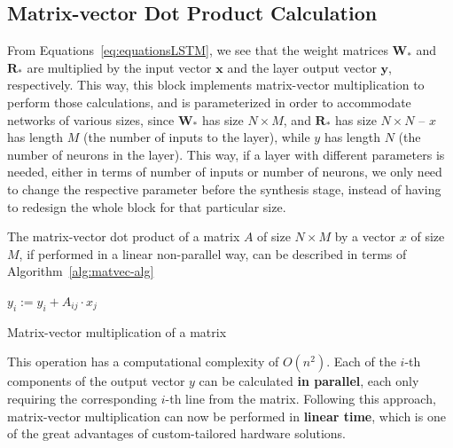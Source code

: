 \documentclass{IEEEtran}
\newcommand{\mb}[1]{\mathbf{#1}}
\begin{document}
\subsection{Matrix-vector Dot Product Calculation}\label{sec:proprarch_dot}
From Equations~\ref{eq:equationsLSTM}, we see that the weight matrices $\mb{W}_*$ and $\mb{R}_*$ are
multiplied by the input vector $\mb{x}$ and the layer output vector $\mb{y}$, respectively. This way,
this block implements matrix-vector multiplication to perform those calculations, and is parameterized in
order to accommodate networks of various sizes, since $\mb{W}_*$ has size $N\times M$, and $\mb{R}_*$
has size $N\times N$ -- $x$ has length $M$ (the number of inputs to the layer), while $y$ has length $N$
(the number of neurons in the layer). This way, if a layer with different parameters is needed, either in terms of
number of inputs or number of neurons, we only need to change the respective parameter before the synthesis stage,
instead of having to redesign the whole block for that particular size.

The matrix-vector dot product of a matrix $A$ of size $N \times M$ by a vector $x$ of size $M$, if performed in a linear non-parallel way, can be described in terms of Algorithm~\ref{alg:matvec-alg}

\begin{algorithm}
\begin{algorithmic}
    \State $y_i := y_i + A_{ij} \cdot x_j$
    \EndFor
\EndFor
\end{algorithmic}
\caption{Matrix-vector multiplication of a matrix}
\label{alg:matvec-alg}
\end{algorithm}
This operation has a computational complexity of $O(n^2)$. Each of the $i$-th components of the output vector $y$ can be calculated \textbf{in parallel},
each only requiring the corresponding $i$-th line from the matrix. Following this approach, matrix-vector multiplication can now be performed in \textbf{linear time},
which is one of the great advantages of custom-tailored hardware solutions.
\end{document}
